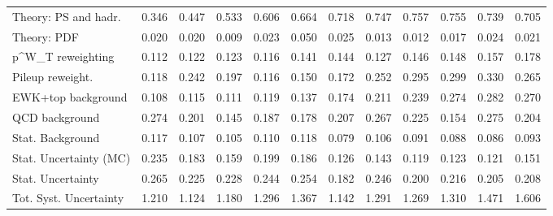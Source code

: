 \begin{tabular}{l|p{0.6cm}p{0.6cm}p{0.6cm}p{0.6cm}p{0.6cm}p{0.6cm}p{0.6cm}p{0.6cm}p{0.6cm}p{0.6cm}p{0.6cm}}
Theory: PS and hadr.                     & 0.346 & 0.447 & 0.533 & 0.606 & 0.664 & 0.718 & 0.747 & 0.757 & 0.755 & 0.739 & 0.705 \\
Theory: PDF                              & 0.020 & 0.020 & 0.009 & 0.023 & 0.050 & 0.025 & 0.013 & 0.012 & 0.017 & 0.024 & 0.021 \\
p^{W}_{T} reweighting                    & 0.112 & 0.122 & 0.123 & 0.116 & 0.141 & 0.144 & 0.127 & 0.146 & 0.148 & 0.157 & 0.178 \\
Pileup reweight.                         & 0.118 & 0.242 & 0.197 & 0.116 & 0.150 & 0.172 & 0.252 & 0.295 & 0.299 & 0.330 & 0.265 \\
EWK+top background                       & 0.108 & 0.115 & 0.111 & 0.119 & 0.137 & 0.174 & 0.211 & 0.239 & 0.274 & 0.282 & 0.270 \\
QCD background                           & 0.274 & 0.201 & 0.145 & 0.187 & 0.178 & 0.207 & 0.267 & 0.225 & 0.154 & 0.275 & 0.204 \\
Stat. Background                         & 0.117 & 0.107 & 0.105 & 0.110 & 0.118 & 0.079 & 0.106 & 0.091 & 0.088 & 0.086 & 0.093 \\
Stat. Uncertainty (MC)                   & 0.235 & 0.183 & 0.159 & 0.199 & 0.186 & 0.126 & 0.143 & 0.119 & 0.123 & 0.121 & 0.151 \\
\hline
Stat. Uncertainty                        & 0.265 & 0.225 & 0.228 & 0.244 & 0.254 & 0.182 & 0.246 & 0.200 & 0.216 & 0.205 & 0.208 \\
\hline
Tot. Syst. Uncertainty                   & 1.210 & 1.124 & 1.180 & 1.296 & 1.367 & 1.142 & 1.291 & 1.269 & 1.310 & 1.471 & 1.606 \\
\hline
\end{tabular}
